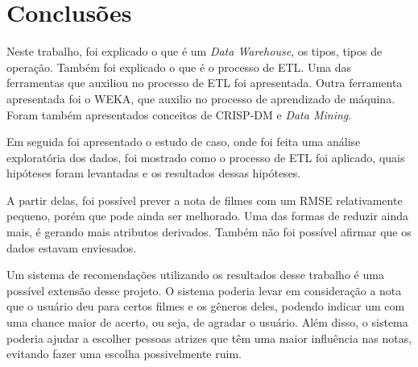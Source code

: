 \section{Conclusões}
Neste trabalho, foi explicado o que é um \textit{Data Warehouse}, os tipos, tipos de operação. Também foi explicado o que é o processo de ETL. Uma das ferramentas que auxiliou no processo de ETL \pdi foi apresentada. Outra ferramenta apresentada foi o WEKA, que auxilio no processo de aprendizado de máquina. Foram também apresentados conceitos de CRISP-DM e \textit{Data Mining}.

Em seguida foi apresentado o estudo de caso, onde foi feita uma análise exploratória dos dados, foi mostrado como o processo de ETL foi aplicado, quais hipóteses foram levantadas e os resultados dessas hipóteses. 

A partir delas, foi possível prever a nota de filmes com um RMSE relativamente pequeno, porém que pode ainda ser melhorado. Uma das formas de reduzir ainda mais, é gerando mais atributos derivados. Também não foi possível afirmar que os dados estavam enviesados.

Um sistema de recomendações utilizando os resultados desse trabalho é uma possível extensão desse projeto. O sistema poderia levar em consideração a nota que o usuário deu para certos filmes e os gêneros deles, podendo indicar um com uma chance maior de acerto, ou seja, de agradar o usuário. Além disso, o sistema poderia ajudar a escolher pessoas atrizes que têm uma maior influência nas notas, evitando fazer uma escolha possivelmente ruim.